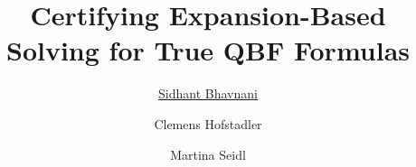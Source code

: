 \documentclass[utf8,aspectratio=169,ngerman,english]{beamer}
\begin{document}


\title[short title]{Certifying Expansion-Based Solving for True QBF Formulas}

\author[short authors]{\underline{Sidhant Bhavnani} \and Clemens Hofstadler \and Martina Seidl}


\date{}




\end{document}
